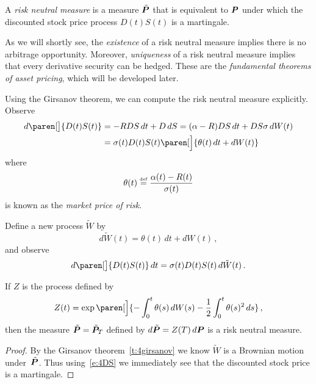 \begin{definition}
  A \emph{risk neutral measure} is a measure $\tilde\P$ that is equivalent to $\P$ under which the discounted stock price process $D(t) S(t)$ is a martingale.
\end{definition}

As we will shortly see, the \emph{existence} of a risk neutral measure implies there is no arbitrage opportunity.
Moreover, \emph{uniqueness} of a risk neutral measure implies that every derivative security can be hedged.
These are the \emph{fundamental theorems of asset pricing}, which will be developed later.

Using the Girsanov theorem, we can compute the risk neutral measure explicitly.
Observe
\begin{align*}
  d\paren[\big]{D(t) S(t)}
    &= -R D S \, dt + D \, dS
    = (\alpha-R) D S \, dt + D S \sigma \, dW(t)
  \\
    &= \sigma(t) D(t) S(t) \paren[\Big]{
	  \theta(t) \, dt + dW(t) }
\end{align*}
where
\begin{equation*}
  \theta(t) \defeq \frac{\alpha(t) - R(t)}{\sigma(t)}
\end{equation*}
is known as the \emph{market price of risk}.

Define a new process $\tilde W$ by
\begin{equation*}
  d\tilde W(t) = \theta(t) \, dt + dW(t)\,,
\end{equation*}
and observe
\begin{equation}\label{e:4DS}
  d\paren[\big]{ D(t) S(t) } \, dt = \sigma(t) D(t) S(t) \, d\tilde W(t)\,.
\end{equation}

\begin{proposition}
  If $Z$ is the process defined by
  \begin{equation*}
    Z(t) = \exp\paren[\Big]{
      -\int_0^t \theta(s) \, dW(s) - \frac{1}{2} \int_0^t \theta(s)^2 \, ds
    }\,,
  \end{equation*}
  then the measure $\tilde\P = \tilde\P_T$ defined by $d\tilde\P = Z(T) \, d\P$ is a risk neutral measure.
\end{proposition}
\begin{proof}
  By the Girsanov theorem~\ref{t:4girsanov} we know $\tilde W$ is a Brownian motion under~$\tilde\P$.
  Thus using~\eqref{e:4DS} we immediately see that the discounted stock price is a martingale.
\end{proof}

